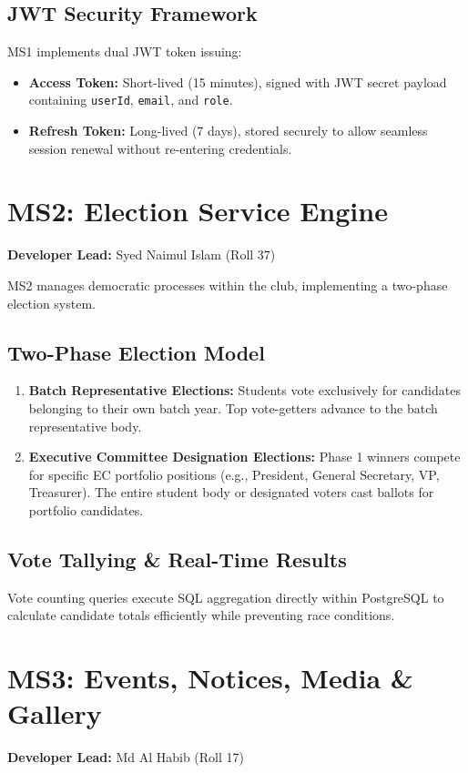 \documentclass[12pt, a4paper]{report}
\begin{document}
\subsection{JWT Security Framework}
MS1 implements dual JWT token issuing:
\begin{itemize}
    \item \textbf{Access Token:} Short-lived (15 minutes), signed with JWT secret payload containing \texttt{userId}, \texttt{email}, and \texttt{role}.
    \item \textbf{Refresh Token:} Long-lived (7 days), stored securely to allow seamless session renewal without re-entering credentials.
\end{itemize}

\section{MS2: Election Service Engine}
\textbf{Developer Lead:} Syed Naimul Islam (Roll 37)

MS2 manages democratic processes within the club, implementing a two-phase election system.

\subsection{Two-Phase Election Model}
\begin{enumerate}[label=\bfseries Phase \arabic*:]
    \item \textbf{Batch Representative Elections:} Students vote exclusively for candidates belonging to their own batch year. Top vote-getters advance to the batch representative body.
    \item \textbf{Executive Committee Designation Elections:} Phase 1 winners compete for specific EC portfolio positions (e.g., President, General Secretary, VP, Treasurer). The entire student body or designated voters cast ballots for portfolio candidates.
\end{enumerate}

\subsection{Vote Tallying \& Real-Time Results}
Vote counting queries execute SQL aggregation directly within PostgreSQL to calculate candidate totals efficiently while preventing race conditions.

\section{MS3: Events, Notices, Media \& Gallery}
\textbf{Developer Lead:} Md Al Habib (Roll 17)
\end{document}
